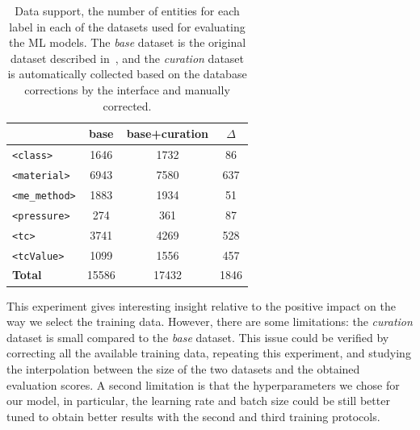 \begin{table}[htbp]
\centering
\small
\caption{Data support, the number of entities for each label in each of the datasets used for evaluating the ML models. The \emph{base} dataset is the original dataset described in~\cite{foppiano2021supermat}, and the \emph{curation} dataset is automatically collected based on the database corrections by the interface and manually corrected.}
\begin{tabular}{lccc}
\toprule
                        & \textbf{base}     & \textbf{base+curation}    & \textbf{$\Delta$}  \\ 
\midrule
\texttt{<class>}        & 1646              & 1732                      &  86                \\
\texttt{<material>}     & 6943              & 7580                      &  637               \\
\texttt{<me\_method>}   & 1883              & 1934                      &  51                \\
\texttt{<pressure>}     & 274               & 361                       &  87                \\
\texttt{<tc>}           & 3741              & 4269                      &  528               \\
\texttt{<tcValue>}      & 1099              & 1556                      &  457               \\
\midrule
\textbf{Total}          & 15586             & 17432                     & 1846               \\ 
\bottomrule
\end{tabular}
\label{tab:training-support}
\end{table}


This experiment gives interesting insight relative to the positive impact on the way we select the training data. 
However, there are some limitations: the \emph{curation} dataset is small compared to the \emph{base} dataset. This issue could be verified by correcting all the available training data, repeating this experiment, and studying the interpolation between the size of the two datasets and the obtained evaluation scores. 
A second limitation is that the hyperparameters we chose for our model, in particular, the learning rate and batch size could be still better tuned to obtain better results with the second and third training protocols.



